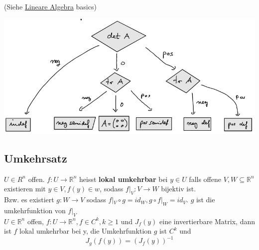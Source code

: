     (Siehe \href{#1.1}{Lineare Algebra} basics)\\
    \begin{minipage}{\linewidth}
      \includegraphics[width=\linewidth]{./sources/entscheidungsbaum-definitheit.png}
      \label{fig:fig1}
    \end{minipage}
\subsection{Umkehrsatz}
    $U\in R^n$ offen. $f:U\rightarrow\mathbb R^n$ heisst \textbf{lokal
    umkehrbar} bei $y\in U$ falls offene $V,W\subseteq\mathbb R^n$ existieren
    mit $y\in V, f(y)\in w$, sodass $f|_V:V\rightarrow W$ bijektiv ist.\\
    Bzw. es existiert $g:W\rightarrow V$ sodass $f|_V\circ g=id_W, g\circ
    f|_W=id_V$. $g$ ist die umkehrfunktion von $f|_V$\\
  $U\in\mathbb R^n$ offen, $f:U\rightarrow\mathbb R^n, f\in C^k, k\geq1$ und
  $J_f(y)$ eine invertierbare Matrix, dann ist $f$ lokal umkehrbar bei y, die
  Umkehrfunktion $g$ ist $C^k$ und $$J_g(f(y))=(J_f(y))^{-1}$$


